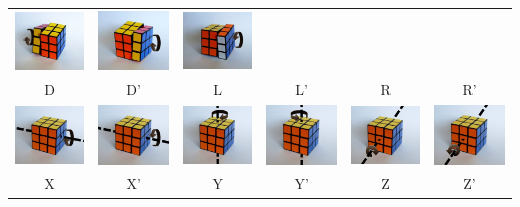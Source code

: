 \documentclass{beamer}
\begin{document}
\begin{frame}
\begin{table}[h]
\begin{tabular}{cccccc}
\includegraphics[width=.12\textwidth]{../graphics/moves/L_inv.png} &
\includegraphics[width=.12\textwidth]{../graphics/moves/R.png} &
\includegraphics[width=.12\textwidth]{../graphics/moves/R_inv.png} \\
D & D' & L & L' & R & R' \\
\includegraphics[width=.12\textwidth]{../graphics/moves/X.png} &
\includegraphics[width=.12\textwidth]{../graphics/moves/X_inv.png} &
\includegraphics[width=.12\textwidth]{../graphics/moves/Y.png} &
\includegraphics[width=.12\textwidth]{../graphics/moves/Y_inv.png} &
\includegraphics[width=.12\textwidth]{../graphics/moves/Z.png} &
\includegraphics[width=.12\textwidth]{../graphics/moves/Z_inv.png} \\
X & X' & Y & Y' & Z & Z'
\end{tabular}
\end{table}
\end{frame}
\end{document}
